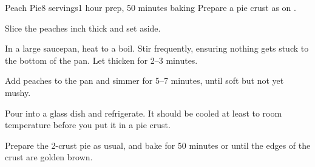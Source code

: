 \documentclass[../Cookbook.tex]{subfiles}
\begin{document}
\begin{recipe}[PeachPie]{Peach Pie}{8 servings}{1 hour prep, 50 minutes baking}
Prepare a pie crust as on .

Slice the peaches  inch thick and set aside.

In a large saucepan, heat to a boil. Stir frequently, ensuring nothing gets stuck to the bottom of the pan. Let thicken for 2--3 minutes.

Add peaches to the pan and simmer for 5--7 minutes, until soft but not yet mushy.

Pour into a glass dish and refrigerate. It should be cooled at least to room temperature before you put it in a pie crust.

 Prepare the 2-crust pie as usual, and bake for 50 minutes or until the edges of the crust are golden brown.

\end{recipe}
\end{document}
